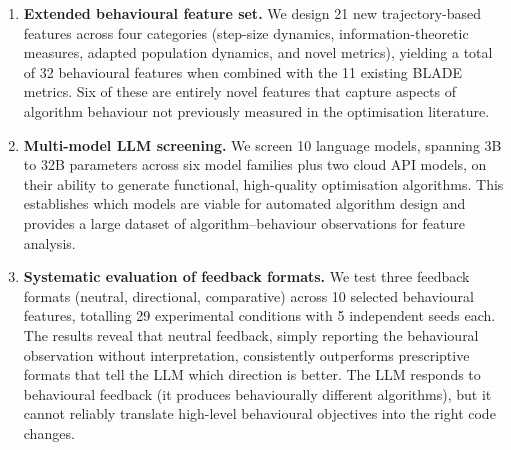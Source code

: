 \begin{enumerate}
  \item \textbf{Extended behavioural feature set.} We design 21 new trajectory-based features across four categories (step-size dynamics, information-theoretic measures, adapted population dynamics, and novel metrics), yielding a total of 32 behavioural features when combined with the 11 existing BLADE metrics. Six of these are entirely novel features that capture aspects of algorithm behaviour not previously measured in the optimisation literature.

  \item \textbf{Multi-model LLM screening.} We screen 10 language models, spanning 3B to 32B parameters across six model families plus two cloud API models, on their ability to generate functional, high-quality optimisation algorithms. This establishes which models are viable for automated algorithm design and provides a large dataset of algorithm--behaviour observations for feature analysis.

  \item \textbf{Systematic evaluation of feedback formats.} We test three feedback formats (neutral, directional, comparative) across 10 selected behavioural features, totalling 29 experimental conditions with 5 independent seeds each. The results reveal that neutral feedback, simply reporting the behavioural observation without interpretation, consistently outperforms prescriptive formats that tell the LLM which direction is better. The LLM responds to behavioural feedback (it produces behaviourally different algorithms), but it cannot reliably translate high-level behavioural objectives into the right code changes.
\end{enumerate}
